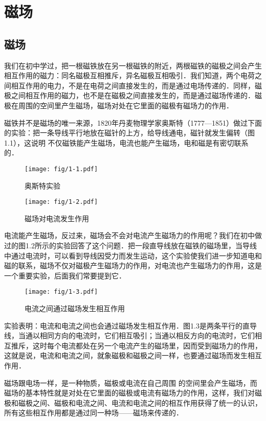 \chapter{磁场}
\section{磁场}
我们在初中学过，把一根磁铁放在另一根磁铁的附近，两根磁铁的磁极之间会产生相互作用的磁力：同名磁极互相推斥，异名磁极互相吸引．我们知道，两个电荷之间相互作用的电力，不是在电荷之间直接发生的，而是通过电场传递的．同样，磁极之间相互作用的磁力，也不是在磁极之间直接发生的，而是通过磁场传递的．磁极在周围的空间里产生磁场，磁场对处在它里面的磁极有磁场力的作用．

磁铁并不是磁场的唯一来源，1820年丹麦物理学家奥斯特（1777—1851）做过下面的实验：把一条导线平行地放在磁针的上方，给导线通电，磁针就发生偏转（图1.1），这说明
不仅磁铁能产生磁场，电流也能产生磁场，电和磁是有密切联系的．
\begin{figure}[htp]
\centering
\begin{minipage}[t]{0.48\textwidth}
\centering
\texttt{[image: fig/1-1.pdf]}
\caption{奥斯特实验}
\end{minipage}
\begin{minipage}[t]{0.48\textwidth}
\centering
\texttt{[image: fig/1-2.pdf]}
\caption{磁场对电流发生作用}
\end{minipage}
\end{figure}

电流能产生磁场，反过来，磁场会不会对电流产生磁场力的作用呢？我们在初中做过的图1.2所示的实验回答了这个问题．把一段直导线放在磁铁的磁场里，当导线中通过电流时，可以看到导线因受力而发生运动，这个实验使我们进一步知道电和磁的联系，磁场不仅对磁极产生磁场力的作用，对电流也产生磁场力的作用，这是一个重要实验，后面我们常要提到它．

\begin{figure}[htp]\centering
\texttt{[image: fig/1-3.pdf]}
\caption{电流之间通过磁场发生相互作用}
\end{figure}

实验表明：电流和电流之间也会通过磁场发生相互作用．图1.3是两条平行的直导线，当通以相同方向的电流时，它们相互吸引；当通以相反方向的电流时，它们相互推斥，这时每个电流都处在另一个电流产生的磁场里，因而受到磁场力的作用，这就是说，电流和电流之间，就象磁极和磁极之间一样，也要通过磁场而发生相互作用．

磁场跟电场一样，是一种物质，磁极或电流在自己周围
的空间里会产生磁场，而磁场的基本特性就是对处在它里面的磁极或电流有磁场力的作用，这样，我们对磁极和磁极之间、磁极和电流之间、电流和电流之间的相互作用获得了统一的认识，所有这些相互作用都是通过同一种场——磁场来传递的．

